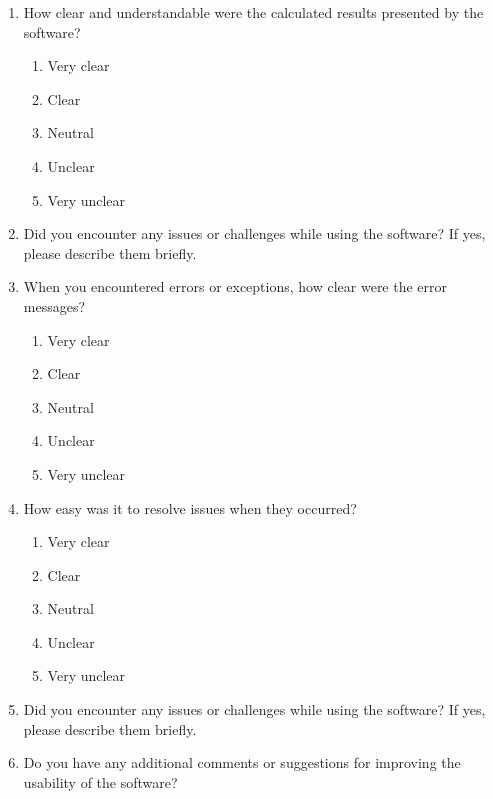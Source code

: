 \documentclass[12pt, titlepage]{article}
\begin{document}
\begin{enumerate}
    \item How clear and understandable were the calculated results presented by the software?
    \begin{enumerate}
        \item Very clear
        \item Clear
        \item Neutral
        \item Unclear
        \item Very unclear
    \end{enumerate}
    \item Did you encounter any issues or challenges while using the software? If yes, please describe them briefly.
    \item When you encountered errors or exceptions, how clear were the error messages?
        \begin{enumerate}
        \item Very clear
        \item Clear
        \item Neutral
        \item Unclear
        \item Very unclear
    \end{enumerate}
    \item How easy was it to resolve issues when they occurred?
        \begin{enumerate}
        \item Very clear
        \item Clear
        \item Neutral
        \item Unclear
        \item Very unclear
    \end{enumerate}
    \item Did you encounter any issues or challenges while using the software? If yes, please describe them briefly.
    \item Do you have any additional comments or suggestions for improving the usability of the software?

\end{enumerate}
\end{document}
